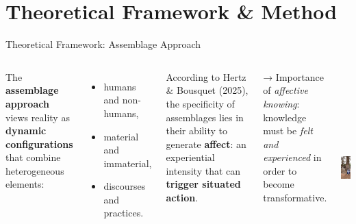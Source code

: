 \documentclass[newPxFont]{beamer}
\begin{document}
\section{Theoretical Framework \& Method}

\begin{frame}[c]{Theoretical Framework: Assemblage Approach}
  \vspace{-0.5cm}
  \begin{columns}[onlytextwidth,T]
    \column{\dimexpr\linewidth-30mm-5mm}

    The \textbf{assemblage approach} views reality as \textbf{dynamic configurations} 
    that combine heterogeneous elements:
    \begin{itemize}
      \item humans and non-humans,
      \item material and immaterial,
      \item discourses and practices.
    \end{itemize}

    \vspace{0.3cm}
    According to Hertz \& Bousquet (2025), the specificity of assemblages lies in their
    ability to generate \textbf{affect}: an experiential intensity that can 
    \textbf{trigger situated action}.
    
    \vspace{0.3cm}
    → Importance of \textit{affective knowing}: knowledge must be \textit{felt and experienced}
    in order to become transformative.

    \column{30mm}
    \includegraphics[height=7.5cm]{img/diohine_liens}
  \end{columns}
\end{frame}
\end{document}
